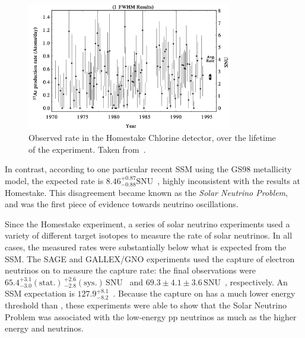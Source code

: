 \begin{figure}
    \centering
    \includegraphics[width=0.8\textwidth]{1_NeutrinoTheory/Figs/homestake_summary_results.png}
    \caption[]{Observed rate in the Homestake Chlorine detector, over the lifetime of the experiment. Taken from~\cite{clevelandMeasurementSolarElectron1998}.}
    \label{fig:homestake_results}
\end{figure}

In contrast, according to one particular recent SSM using the GS98 metallicity model, the expected rate is $8.46^{+0.87}_{-0.88}\mathrm{ SNU}$~\cite{pena-garaySolarNeutrinosSolar2008}, highly inconsistent with the results at Homestake. This disagreement became known as the \textit{Solar Neutrino Problem}, and was the first piece of evidence towards neutrino oscillations.

Since the Homestake experiment, a series of solar neutrino experiments used a variety of different target isotopes to measure the rate of solar neutrinos. In all cases, the measured rates were substantially below what is expected from the SSM. The SAGE and GALLEX/GNO experiments used the capture of electron neutrinos on  to measure the capture rate: the final observations were $65.4^{+3.1}_{-3.0}(\mathrm{stat.})\,^{+2.6}_{-2.8}(\mathrm{sys.})\,\mathrm{ SNU}$~\cite{abdurashitovMeasurementSolarNeutrino2009} and $69.3\pm4.1\pm3.6\,\mathrm{ SNU}$~\cite{altmannCompleteResultsFive2005}, respectively. An SSM expectation is $127.9^{+8.1}_{-8.2}$~\cite{pena-garaySolarNeutrinosSolar2008}. Because the capture on  has a much lower energy threshold than , these experiments were able to show that the Solar Neutrino Problem was associated with the low-energy pp neutrinos as much as the higher energy \beight{} and  neutrinos.

